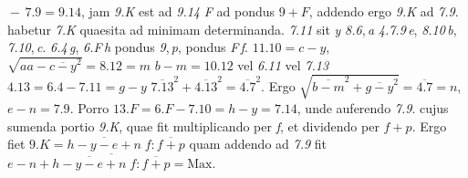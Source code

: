 $\!-\,\textit{7.9}=\textit{9.14}$,
jam \textit{9.K} est ad \textit{9.14} 
\textit{F} ad pondus $\textit{9}+F$, addendo ergo \textit{9.K} ad \textit{7.9}. habetur \textit{7.K} quaesita ad minimam
%
%
determinanda.
\pend
\pstart
\textit{7.11} sit \textit{y}\bracks{,}
\textit{8.6},\,\textit{a}\bracks{,} \textit{4.7.9}\,\textit{e}, 
\textit{8.10}\,\textit{b}, \textit{7.10},\,\textit{c}.\bracks{,} 
\textit{6.4}\,\textit{g}, \textit{6.F}\,\textit{h}\bracks{,} pondus \textit{9},\,\textit{p},
pondus \textit{F}\,\textit{f}. %
\pend
\pstart
$\textit{11.10}=c-y$,
$\sqrt{aa-\overline{c-y}^2}=\textit{8.12}=m$\bracks{,}
$b-m=\textit{10.12}$ vel \textit{6.11} vel \textit{7.13}\bracks{,} $\textit{4.13}=\textit{6.4}-\textit{7.11}=g-y$\bracks{,} 
$\overline{7.13}^2+\overline{4.13}^2=\overline{4.7}^2$.
Ergo $\sqrt{\overline{b-m}^2+\overline{g-y}^2}=\overline{4.7}=n$, $e-n=\textit{7.9}$. 
\pend
\pstart
Porro $\textit{13}.F=\textit{6}.F-7.\textit{10}=h-y=\textit{7.14}$, unde auferendo \textit{7.9}. 
cujus%
sumenda portio \textit{9.K}, quae fit multiplicando per \textit{f}, et dividendo per $f+p$. Ergo fiet $\textit{9}.K=\overline{h-y-e+n}\;f:\overline{f+p}$ quam addendo ad \textit{7.9} 
fit $e-n+\overline{\overline{h-y-e+n}\;f:\overline{f+p}}= \text{Max}$.

